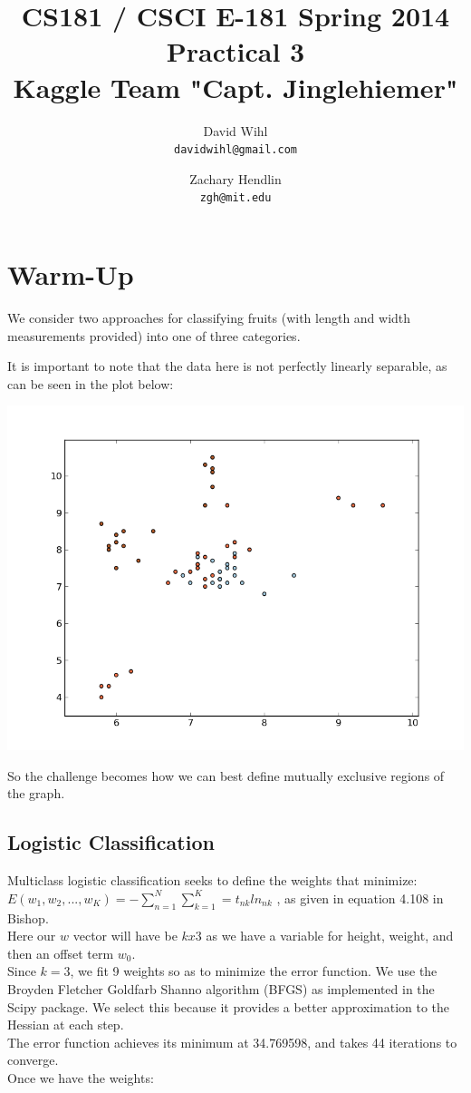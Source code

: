 \documentclass[11pt, oneside]{article}   	%
\title{CS181 / CSCI E-181 Spring 2014 Practical 3 \\ 
{\large Kaggle Team "Capt. Jinglehiemer"}
}
\author{
  David Wihl\\
  \texttt{davidwihl@gmail.com}
  \and
  Zachary Hendlin\\
  \texttt{zgh@mit.edu} 
}
\begin{document}
\maketitle
\section*{Warm-Up}

We consider two approaches for classifying fruits (with length and width measurements provided) into one of three categories.

It is important to note that the data here is not perfectly linearly separable, as can be seen in the plot below:
\begin{center}
\includegraphics[scale=.6]{figure_3}
\end{center}
So the challenge becomes how we can best define mutually exclusive regions of the graph.

\subsection*{Logistic Classification}

Multiclass logistic classification seeks to define the weights that minimize:
\\
 $E(w_1, w_2, ..., w_K) =  -\sum\limits_{n=1}^N \sum\limits_{k=1}^K = t_{nk} ln_{nk}$ , 
as given in equation 4.108 in Bishop.
\
\\
Here our $w$ vector will have be $k x 3$ as we have a variable for height, weight, and then an offset term $w_0$.
\
\\
Since $k=3$, we fit 9 weights so as to minimize the error function. We use the Broyden Fletcher Goldfarb Shanno algorithm (BFGS) as implemented in the Scipy package. We select this because it provides a better approximation to the Hessian at each step.
\
\\
The error function achieves its minimum at 34.769598, and takes 44 iterations to converge.
\\
Once we have the weights:
\end{document}
